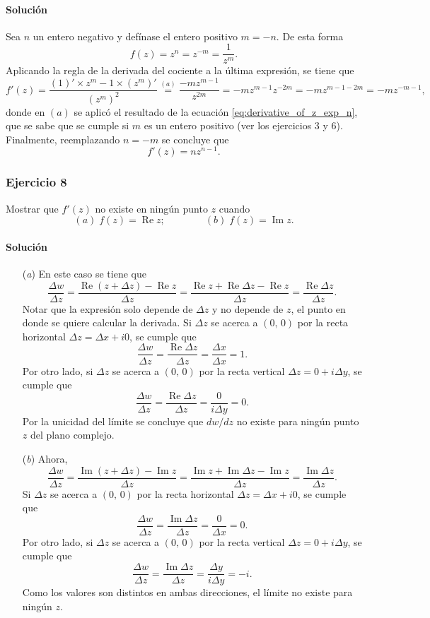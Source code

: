 \documentclass[a4paper]{report}
\renewcommand{\Re}{\operatorname{Re}}
\renewcommand{\Im}{\operatorname{Im}}
\begin{document}
\paragraph{Solución} Sea \(n\) un entero negativo y defínase el entero positivo \(m=-n\). De esta forma
\[
 f(z)=z^n=z^{-m}=\frac{1}{z^m}.
\]
Aplicando la regla de la derivada del cociente a la última expresión, se tiene que 
\[
 f'(z)=\frac{(1)'\times z^m-1\times(z^m)'}{(z^m)^2}
  \overset{(a)}{=}\frac{-mz^{m-1}}{z^{2m}}=-mz^{m-1}z^{-2m}=-mz^{m-1-2m}=-mz^{-m-1},
\]
donde en \((a)\) se aplicó el resultado de la ecuación \ref{eq:derivative_of_z_exp_n}, que se sabe que se cumple si \(m\) es un entero positivo (ver los ejercicios 3 y 6). Finalmente, reemplazando \(n=-m\) se concluye que 
\[
 f'(z)=nz^{n-1}.
\]

\subsubsection{Ejercicio 8}

Mostrar que \(f'(z)\) no existe en ningún punto \(z\) cuando 
\[
 (\textit{a})\;f(z)=\Re z;\qquad\qquad
 (\textit{b})\;f(z)=\Im z.
\]

\paragraph{Solución}  

\begin{enumerate}
 \item[(\textit{a})] En este caso se tiene que 
 \[
  \frac{\Delta w}{\Delta z}=\frac{\Re(z+\Delta z)-\Re z}{\Delta z}=\frac{\Re z+\Re\Delta z-\Re z}{\Delta z}=\frac{\Re\Delta z}{\Delta z}.
 \]
 Notar que la expresión solo depende de \(\Delta z\) y no depende de \(z\), el punto en donde se quiere calcular la derivada. Si \(\Delta z\) se acerca a \((0,\,0)\) por la recta horizontal \(\Delta z=\Delta x+i0\), se cumple que
 \[
  \frac{\Delta w}{\Delta z}=\frac{\Re\Delta z}{\Delta z}=\frac{\Delta x}{\Delta x}=1.
 \]
 Por otro lado, si \(\Delta z\) se acerca a \((0,\,0)\) por la recta vertical \(\Delta z=0+i\Delta y\), se cumple que 
 \[
  \frac{\Delta w}{\Delta z}=\frac{\Re\Delta z}{\Delta z}=\frac{0}{i\Delta y}=0.
 \]
 Por la unicidad del límite se concluye que \(dw/dz\) no existe para ningún punto \(z\) del plano complejo.
 \item[(\textit{b})] Ahora,
 \[
  \frac{\Delta w}{\Delta z}=\frac{\Im(z+\Delta z)-\Im z}{\Delta z}=\frac{\Im z+\Im\Delta z-\Im z}{\Delta z}=\frac{\Im\Delta z}{\Delta z}.
 \]
 Si \(\Delta z\) se acerca a \((0,\,0)\) por la recta horizontal \(\Delta z=\Delta x+i0\), se cumple que
 \[
  \frac{\Delta w}{\Delta z}=\frac{\Im\Delta z}{\Delta z}=\frac{0}{\Delta x}=0.
 \]
 Por otro lado, si \(\Delta z\) se acerca a \((0,\,0)\) por la recta vertical \(\Delta z=0+i\Delta y\), se cumple que 
 \[
  \frac{\Delta w}{\Delta z}=\frac{\Im\Delta z}{\Delta z}=\frac{\Delta y}{i\Delta y}=-i.
 \]
 Como los valores son distintos en ambas direcciones, el límite no existe para ningún \(z\).
\end{enumerate} 
 
\end{document}
